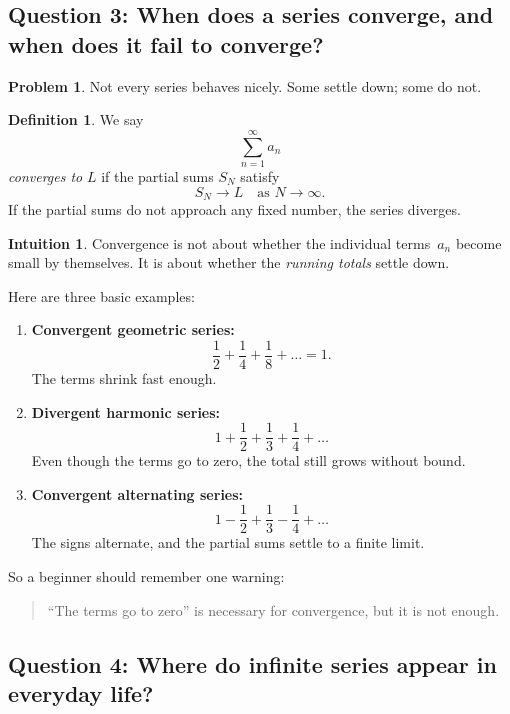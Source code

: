 \documentclass[11pt,a4paper]{article}
\theoremstyle{definition}
\newtheorem*{problem}{Problem}
\newtheorem*{intuition}{Intuition}
\newtheorem*{definitionblock}{Definition}
\theoremstyle{plain}
\begin{document}
\subsection{Question 3: When does a series converge, and when does it fail to converge?}

\begin{problem}
Not every series behaves nicely.
Some settle down; some do not.
\end{problem}

\begin{definitionblock}
We say
\[
\sum_{n=1}^{\infty} a_n
\]
\emph{converges to} \(L\) if the partial sums \(S_N\) satisfy
\[
S_N \to L \quad \text{as } N\to\infty.
\]
If the partial sums do not approach any fixed number, the series diverges.
\end{definitionblock}

\begin{intuition}
Convergence is not about whether the individual terms \(\,a_n\) become small by themselves.
It is about whether the \emph{running totals} settle down.
\end{intuition}

Here are three basic examples:

\begin{enumerate}
  \item \textbf{Convergent geometric series:}
  \[
  \frac{1}{2}+\frac{1}{4}+\frac{1}{8}+\dots = 1.
  \]
  The terms shrink fast enough.

  \item \textbf{Divergent harmonic series:}
  \[
  1+\frac{1}{2}+\frac{1}{3}+\frac{1}{4}+\dots
  \]
  Even though the terms go to zero, the total still grows without bound.

  \item \textbf{Convergent alternating series:}
  \[
  1-\frac{1}{2}+\frac{1}{3}-\frac{1}{4}+\dots
  \]
  The signs alternate, and the partial sums settle to a finite limit.
\end{enumerate}

So a beginner should remember one warning:
\begin{quote}
``The terms go to zero'' is necessary for convergence, but it is not enough.
\end{quote}

\subsection{Question 4: Where do infinite series appear in everyday life?}
\end{document}
